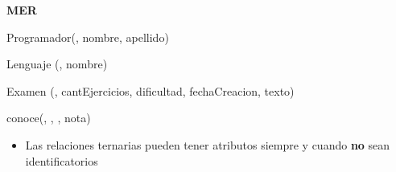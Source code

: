 \begin{multicols}{2}
	
	\textbf{MER}
	
	Programador(, nombre, apellido)
	
	Lenguaje	(, nombre)
	
	Examen	(, cantEjercicios, dificultad, fechaCreacion, texto)
	
	conoce(, , , nota)
	
	\columnbreak
	\begin{itemize}
		\item Las relaciones ternarias pueden tener atributos siempre y cuando\textbf{ no } sean identificatorios
	\end{itemize}
	\null\vfill
\end{multicols}

\newpage
